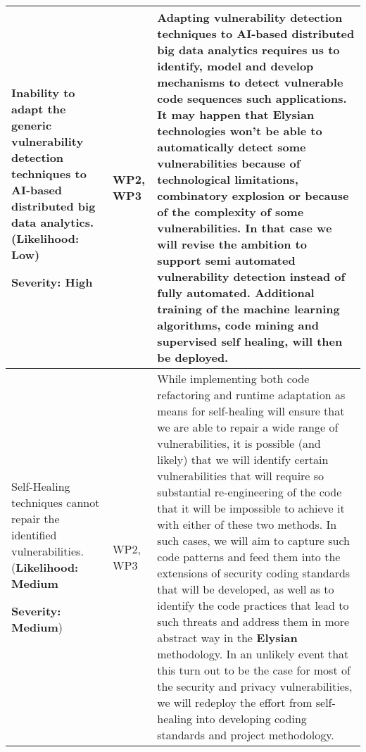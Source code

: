 \documentclass[a4paper,11pt]{article}
\newcommand{\project}[1]{\textbf{#1}\xspace}
\newcommand{\SECURITY}{\project{Elysian}}
\newcommand{\TheProject}{\SECURITY}
\begin{document}
\begin{longtable}{| p{3.5cm} | p{1.5cm} | p{11.8cm}  |}
\\\hline
Inability to adapt the generic vulnerability detection techniques to AI-based distributed big data analytics.
(\textbf{Likelihood: Low})
\par
{\textbf{Severity: High}}
& WP2, WP3 &
Adapting vulnerability detection techniques to AI-based distributed big data analytics requires us to identify, model and develop mechanisms to detect vulnerable code sequences such applications. It may happen that \TheProject{} technologies won't be able to automatically detect some vulnerabilities because of technological limitations, combinatory explosion or because of the complexity of some vulnerabilities. In that case we will revise the ambition to support semi automated vulnerability detection instead of fully automated. Additional training of the machine learning algorithms, code mining and supervised self healing, will then be deployed.

\\\hline
Self-Healing techniques cannot repair the identified vulnerabilities.
(\textbf{Likelihood: Medium}
\par
{\textbf{Severity: Medium}})
& WP2, WP3 &
While implementing both code refactoring and runtime adaptation as means for self-healing will ensure that we are able to repair a wide range of vulnerabilities, it is possible (and likely) that we will identify certain vulnerabilities that will require so substantial re-engineering of the code that it will be impossible to achieve it with either of these two methods. In such cases, we will aim to capture such code patterns and feed them into the extensions of security coding standards that will be developed, as well as to identify the code practices that lead to such threats and address them in more abstract way in the \TheProject{} methodology. In an unlikely event that this turn out to be the case for most of the security and privacy vulnerabilities, we will redeploy the effort from self-healing into developing coding standards and project methodology.


\end{longtable}
\end{document}
